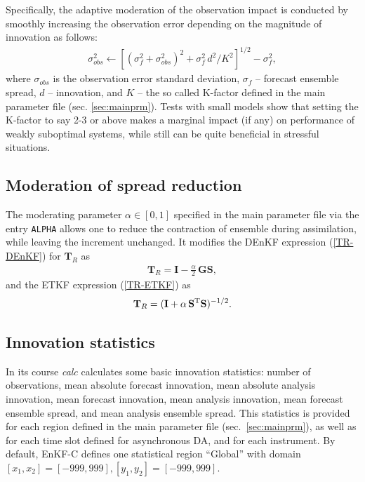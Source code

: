 \documentclass[11pt]{report}
\newcommand{\mb} {\mathbf}
\newcommand{\T}{^{\tiny \mathrm T}}
\begin{document}
Specifically, the adaptive moderation of the observation impact is conducted by smoothly increasing the observation error depending on the magnitude of innovation as follows:
\begin{align*}
  \sigma^2_{obs} \leftarrow \left[(\sigma_{f}^2 + \sigma_{obs}^2)^2 + \sigma_f^2 \, d^2 / K^2\right]^{1/2} - \sigma_f^2,
\end{align*}
where $\sigma_{obs}$ is the observation error standard deviation, $\sigma_f$ -- forecast ensemble spread, $d$ -- innovation, and $K$ -- the so called K-factor defined in the main parameter file (sec. \ref{sec:mainprm}).
Tests with small models show that setting the K-factor to say 2-3 or above makes a marginal impact (if any) on performance of weakly suboptimal systems, while still can be quite beneficial in stressful situations.

\subsection{Moderation of spread reduction}

The moderating parameter $\alpha \in [0, 1]$ specified in the main parameter file via the entry \verb|ALPHA| allows one to reduce the contraction of ensemble during assimilation, while leaving the increment unchanged.
It modifies the DEnKF expression (\ref{TR-DEnKF}) for $\mb T_R$ as
\begin{align*}
  \mb T_R = \mb I - \frac{\alpha}{2} \, \mb G \mb S,
\end{align*}
and the ETKF expression (\ref{TR-ETKF}) as
\begin{align*}
  \mb T_R = (\mb I + \alpha \, \mb S\T \mb S)^{-1/2}.
\end{align*}

\subsection{Innovation statistics}

In its course \emph{calc} calculates some basic innovation statistics: number of observations, mean absolute forecast innovation, mean absolute analysis innovation, mean forecast innovation, mean analysis innovation, mean forecast ensemble spread, and mean analysis ensemble spread.
This statistics is provided for each region defined in the main parameter file (sec.~\ref{sec:mainprm}), as well as for each time slot defined for asynchronous DA, and for each instrument.
By default, EnKF-C defines one statistical region ``Global'' with domain $[x_1,x_2] = [-999,999], [y_1,y_2] = [-999,999]$.
\end{document}
